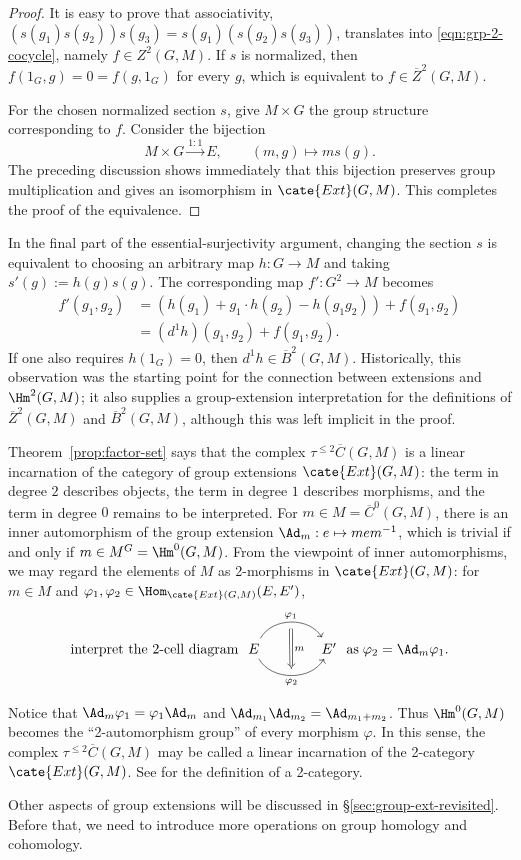 \begin{proof}
	It is easy to prove that associativity,
	$(s(g_1)s(g_2))s(g_3)=s(g_1)(s(g_2)s(g_3))$, translates into
	\eqref{eqn:grp-2-cocycle}, namely $f\in Z^2(G,M)$. If $s$ is normalized,
	then $f(1_G,g)=0=f(g,1_G)$ for every $g$, which is equivalent to
	$f\in\overline{Z}^2(G,M)$.

	For the chosen normalized section $s$, give $M\times G$ the group
	structure corresponding to $f$. Consider the bijection
	\[ M\times G\xrightarrow{1:1}E,\qquad(m,g)\mapsto ms(g). \]
	The preceding discussion shows immediately that this bijection preserves
	group multiplication and gives an isomorphism in $\cate{Ext}(G,M)$.
	This completes the proof of the equivalence.
\end{proof}

In the final part of the essential-surjectivity argument, changing the section
$s$ is equivalent to choosing an arbitrary map $h:G\to M$ and taking
$s'(g):=h(g)s(g)$. The corresponding map $f':G^2\to M$ becomes
\begin{align*}
	f'(g_1,g_2)&=\left(h(g_1)+g_1\cdot h(g_2)-h(g_1g_2)\right)+f(g_1,g_2)\\
	&=(d^1h)(g_1,g_2)+f(g_1,g_2).
\end{align*}
If one also requires $h(1_G)=0$, then
$d^1h\in\overline{B}^2(G,M)$. Historically, this observation was the
starting point for the connection between extensions and $\Hm^2(G,M)$; it
also supplies a group-extension interpretation for the definitions of
$\overline{Z}^2(G,M)$ and $\overline{B}^2(G,M)$, although this was left
implicit in the proof.

\begin{remark}\label{rem:Ext-incarnation}
	Theorem~\ref{prop:factor-set} says that the complex
	$\tau^{\leq2}\overline{C}(G,M)$ is a linear incarnation of the category
	of group extensions $\cate{Ext}(G,M)$: the term in degree $2$ describes
	objects, the term in degree $1$ describes morphisms, and the term in
	degree $0$ remains to be interpreted. For
	$m\in M=\overline{C}^0(G,M)$, there is an inner automorphism of the group
	extension $\Ad_m:e\mapsto mem^{-1}$, which is trivial if and only if
	$m\in M^G=\Hm^0(G,M)$. From the viewpoint of inner automorphisms, we may
	regard the elements of $M$ as 2-morphisms in $\cate{Ext}(G,M)$: for
	$m\in M$ and
	$\varphi_1,\varphi_2\in\Hom_{\cate{Ext}(G,M)}(E,E')$,
	\[ \text{interpret the 2-cell diagram}\;
	\begin{tikzcd}[column sep=large]
		E \arrow[bend left=60,r,"\varphi_1",""' {name=U}]
		\arrow[bend right=60,r,"\varphi_2"',"" {name=D}] &
		E' \arrow[Rightarrow,from=U,to=D,"m"]
	\end{tikzcd}
	\;\text{as}\;\varphi_2=\Ad_m\varphi_1. \]

	Notice that $\Ad_m\varphi_1=\varphi_1\Ad_m$ and
	$\Ad_{m_1}\Ad_{m_2}=\Ad_{m_1+m_2}$. Thus $\Hm^0(G,M)$ becomes the
	“2-automorphism group” of every morphism $\varphi$. In this sense, the
	complex $\tau^{\leq2}\overline{C}(G,M)$ may be called a linear
	incarnation of the 2-category $\cate{Ext}(G,M)$. See
	\cite[\S 3.5]{Li1} for the definition of a 2-category.
\end{remark}

Other aspects of group extensions will be discussed in
\S\ref{sec:group-ext-revisited}. Before that, we need to introduce more
operations on group homology and cohomology.
